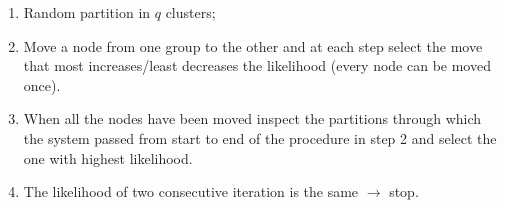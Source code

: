 \documentclass[a4paper,9pt]{extarticle}
\begin{document}
\begin{multicols*}{2}
		\begin{riquadro}
			\begin{enumerate}
				\item Random partition in $q$ clusters;
				\item Move a node from one group to the other and at each step select the move that most increases/least decreases the likelihood (every node can be moved once).
				\item When all the nodes have been moved inspect the partitions through which the system passed from start to end of the procedure in step 2 and select the one with highest likelihood.
				\item The likelihood of two consecutive iteration is the same $\to$ stop.
			\end{enumerate}
		\end{riquadro}

\end{multicols*}
\end{document}
